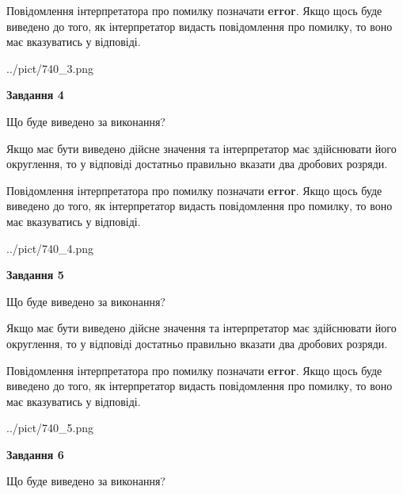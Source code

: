 \documentclass[12pt, ukrainian]{article}
\begin{document}
{\begin {Large}
Повідомлення інтерпретатора про помилку позначати \textbf{error}.
Якщо щось буде виведено до того, як інтерпретатор видасть повідомлення про помилку, 
то воно має вказуватись у відповіді. \par

\begin{center}
	{../pict/740_3.png}
\end{center}
\newpage

{\begin {center}\textbf{Завдання 4}\end {center}}\par
Що буде виведено за виконання? \par

Якщо має бути виведено дійсне значення та інтерпретатор має здійснювати його округлення, 
то у відповіді достатньо правильно вказати два дробових розряди.

Повідомлення інтерпретатора про помилку позначати \textbf{error}.
Якщо щось буде виведено до того, як інтерпретатор видасть повідомлення про помилку, 
то воно має вказуватись у відповіді. \par

\begin{center}
	{../pict/740_4.png}
\end{center}
\newpage

{\begin {center}\textbf{Завдання 5}\end {center}}\par
Що буде виведено за виконання? \par

Якщо має бути виведено дійсне значення та інтерпретатор має здійснювати його округлення, 
то у відповіді достатньо правильно вказати два дробових розряди.

Повідомлення інтерпретатора про помилку позначати \textbf{error}.
Якщо щось буде виведено до того, як інтерпретатор видасть повідомлення про помилку, 
то воно має вказуватись у відповіді. \par

\begin{center}
	{../pict/740_5.png}
\end{center}
\newpage

{\begin {center}\textbf{Завдання 6}\end {center}}\par
Що буде виведено за виконання? \par


\end{Large}}
\end{document}
